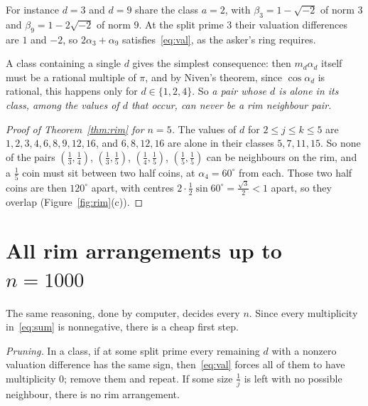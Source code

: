 \documentclass[11pt]{amsart}
\theoremstyle{remark}
\begin{document}
For instance $d=3$ and $d=9$ share the class $a=2$, with $\beta_3=1-\sqrt{-2}$ of norm $3$ and $\beta_9=1-2\sqrt{-2}$ of norm $9$. At the split prime $3$ their valuation differences are $1$ and $-2$, so $2\alpha_3+\alpha_9$ satisfies~\eqref{eq:val}, as the asker's ring requires.

A class containing a single $d$ gives the simplest consequence: then $m_d\alpha_d$ itself must be a rational multiple of $\pi$, and by Niven's theorem, since $\cos\alpha_d$ is rational, this happens only for $d\in\{1,2,4\}$. So \emph{a pair whose $d$ is alone in its class, among the values of $d$ that occur, can never be a rim neighbour pair.}

\begin{proof}[Proof of Theorem~\ref{thm:rim} for $n=5$]
The values of $d$ for $2\le j\le k\le5$ are $1,2,3,4,6,8,9,12,16$, and $6,8,12,16$ are alone in their classes $5,7,11,15$. So none of the pairs $(\frac13,\frac14)$, $(\frac13,\frac15)$, $(\frac14,\frac15)$, $(\frac15,\frac15)$ can be neighbours on the rim, and a $\frac15$ coin must sit between two half coins, at $\alpha_4=60^\circ$ from each. Those two half coins are then $120^\circ$ apart, with centres $2\cdot\frac12\sin60^\circ=\frac{\sqrt3}2<1$ apart, so they overlap (Figure~\ref{fig:rim}(c)).
\end{proof}

\section{All rim arrangements up to $n=1000$}

The same reasoning, done by computer, decides every $n$. Since every multiplicity in~\eqref{eq:sum} is nonnegative, there is a cheap first step.

\emph{Pruning.} In a class, if at some split prime every remaining $d$ with a nonzero valuation difference has the same sign, then~\eqref{eq:val} forces all of them to have multiplicity $0$; remove them and repeat. If some size $\frac1j$ is left with no possible neighbour, there is no rim arrangement.
\end{document}
